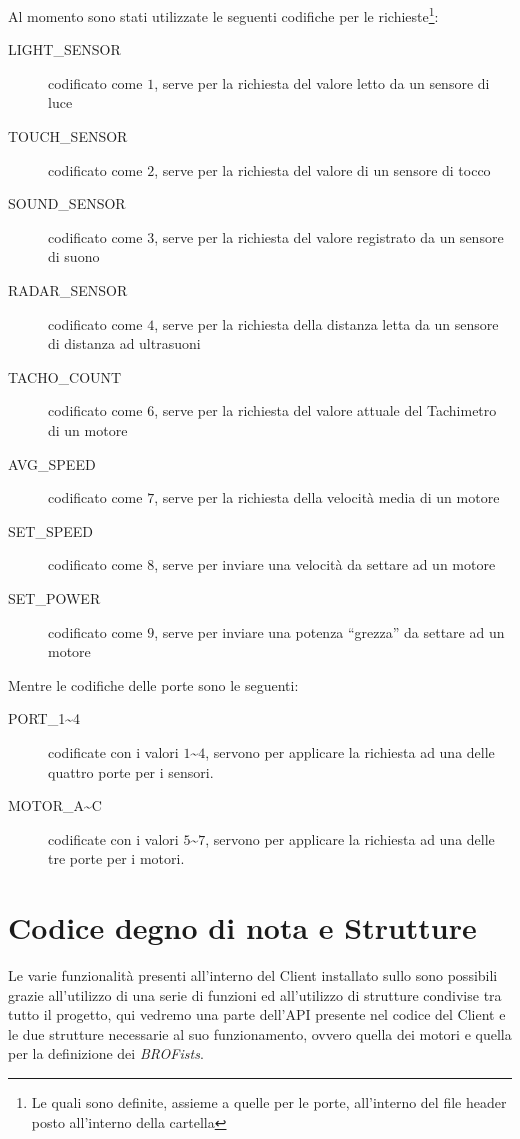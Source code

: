 Al momento sono stati utilizzate le seguenti codifiche per le
richieste\footnote{Le quali sono definite, assieme a quelle per le porte,
all'interno del file header  posto all'interno della
cartella }:
\begin{description}
    \item[LIGHT\_SENSOR] codificato come $1$, serve per la richiesta del
        valore letto da un sensore di luce
    \item[TOUCH\_SENSOR] codificato come $2$, serve per la richiesta del
        valore di un sensore di tocco
    \item[SOUND\_SENSOR] codificato come $3$, serve per la richiesta del
        valore registrato da un sensore di suono
    \item[RADAR\_SENSOR] codificato come $4$, serve per la richiesta della
        distanza letta da un sensore di distanza ad ultrasuoni
    \item[TACHO\_COUNT] codificato come $6$, serve per la richiesta del
        valore attuale del Tachimetro di un motore
    \item[AVG\_SPEED] codificato come $7$, serve per la richiesta della
        velocità media di un motore
    \item[SET\_SPEED] codificato come $8$, serve per inviare una velocità da
        settare ad un motore
    \item[SET\_POWER] codificato come $9$, serve per inviare una potenza
        ``grezza'' da settare ad un motore
\end{description}

Mentre le codifiche delle porte sono le seguenti:
\begin{description}
    \item[PORT\_1\textasciitilde{}4] codificate con i valori
        $1$\textasciitilde{}$4$, servono per applicare la richiesta ad una
        delle quattro porte per i sensori.
    \item[MOTOR\_A\textasciitilde{}C] codificate con i valori
        $5$\textasciitilde{}$7$, servono per applicare la richiesta ad una
        delle tre porte per i motori.
\end{description}

\section{Codice degno di nota e Strutture}
Le varie funzionalità presenti all'interno del Client installato sullo
\SPAM{} sono possibili grazie all'utilizzo di una serie di funzioni ed
all'utilizzo di strutture condivise tra tutto il progetto, qui vedremo una
parte dell'API presente nel codice del Client e le due strutture necessarie
al suo funzionamento, ovvero quella dei motori e quella per la definizione
dei \emph{BROFists}.

\cleardoublepage
